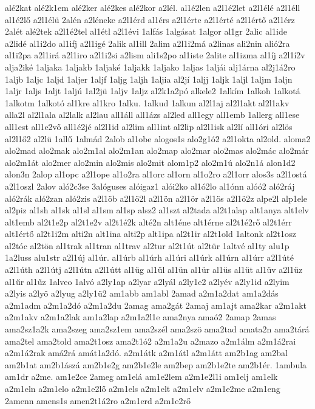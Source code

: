 {alé2kat
alé2k1em
alé2ker
alé2kes
alé2kor
a2lél.
al1é2len
a2l1é2let
a2l1élé
a2l1éll
al1é2lő
a2l1élü
2alén
a2léneke
a2l1érd
al1érs
a2l1érte
a2l1érté
a2l1értő
a2l1érz
2alét
alé2tek
a2l1é2tel
al1étl
a2l1évi
1alfás
1algásat
1algor
al1gr
2alic
al1ide
a2lidé
al1i2do
al1ifj
a2l1igé
2alik
al1ill
2alim
a2l1i2má
a2linas
ali2nin
alió2ra
al1i2pa
a2l1irá
a2l1iro
a2l1i2si
a2lism
ali1s2po
al1iste
2alite
al1izma
al1íj
a2l1í2v
alja2iké
1aljaka
1aljakb
1aljaké
1aljakk
1aljako
1aljas
1aljái
alj1árna
al2j1á2ro
1aljb
1aljc
1aljd
1aljer
1aljf
1aljg
1aljh
1aljia
al2jí
1aljj
1aljk
1aljl
1aljm
1aljn
1aljr
1aljs
1aljt
1aljú
1al2jü
1aljv
1aljz
al2k1a2pó
alkele2
1alkím
1alkoh
1alkotá
1alkotm
1alkotó
al1kre
al1kro
1alku.
1alkud
1alkun
al2l1aj
al2l1akt
al2l1akv
alla2l
al2l1ala
al2lalk
al2lau
all1áll
all1ázs
al2led
all1egy
all1emb
1allerg
all1ese
all1est
all1e2vő
all1é2jé
al2l1id
al2lim
all1int
al2lip
al2l1isk
al2lí
all1óri
al2lös
al2l1ő2
al2lü
1allű
1almád
2alob
al1obe
alogos1s
alo2g1ó2
a2l1okta
al2old.
aloma2
alo2mad
alo2mak
alo2m1al
alo2m1an
alo2map
alo2mar
alo2mas
alo2mác
alo2már
alo2m1át
alo2mer
alo2min
alo2mis
alo2mit
alom1p2
alo2m1ú
alo2n1á
alon1d2
alon3n
2alop
al1opc
a2l1ope
al1o2ra
al1orc
al1orn
al1o2ro
a2l1orr
alos3s
a2l1ostá
a2l1oszl
2alov
aló2c3se
3alóguses
alóigaz1
alói2ko
al1ó2lo
al1ónn
alóó2
aló2ráj
aló2rák
aló2zan
aló2zis
a2l1öb
a2l1ö2l
a2l1ön
a2l1ör
a2l1ös
a2l1ö2z
alpe2l
alp1ele
al2piz
al1sh
al1sk
al1sl
al1sm
al1sp
alsz2
al1szt
al2tada
al2t1alap
alt1anya
alt1elv
alt1emb
al2t1e2p
al2t1e2v
al2t1é2k
alté2n
alt1éne
alt1érne
al2t1é2rő
al2t1érr
alt1értő
al2t1i2m
alti2n
alt1ina
alti2p
alt1ipa
al2t1ir
al2t1old
1altonk
al2t1osz
al2tóc
al2tön
al1trak
al1tran
al1trav
al2tur
al2t1út
al2tür
1altvé
al1ty
alu1p
1a2luss
alu1str
a2l1új
al1úr.
al1úrb
al1úrh
al1úri
al1úrk
al1úrn
al1úrr
a2l1úté
a2l1úth
a2l1útj
a2l1útn
a2l1útt
al1üg
al1ül
al1ün
al1ür
al1üs
al1üt
al1üv
a2l1üz
al1űr
al1űz
1alveo
1alvó
a2ly1ap
a2lyar
a2lyál
a2ly1e2
a2lyév
a2ly1id
a2lyim
a2lyis
a2lyö
a2lyug
a2ly1ü2
am1abb
am1abl
2amad
a2m1a2dat
am1a2dás
a2m1adm
a2m1a2dó
a2m1a2du
2amag
ama2gát
2amaj
am1ajt
ama2kar
a2m1akt
a2m1akv
a2m1a2lak
am1a2lap
a2m1a2l1e
ama2nya
amaó2
2amap
2amas
ama2sz1a2k
ama2szeg
ama2sz1em
ama2szél
ama2szö
ama2tad
amata2n
ama2tárá
ama2tel
ama2told
ama2t1osz
ama2t1ó2
a2m1a2u
a2mazo
a2m1álm
a2m1á2rai
a2m1á2rak
amá2rá
amát1a2dó.
a2m1átk
a2m1átl
a2m1átt
am2b1ag
am2bal
am2b1at
am2b1ászá
am2b1e2g
am2b1e2le
am2bep
am2b1e2te
am2b1ér.
1ambula
am1dr
a2me.
am1e2ce
2ameg
am1elá
am1e2lem
a2m1e2l1i
am1elj
am1elk
a2m1eln
a2m1elo
a2m1e2lő
a2m1els
a2m1elt
a2m1elv
a2m1e2me
a2m1eng
2amenn
amens1s
amen2t1á2ro
a2m1erd
a2m1e2rő
}
